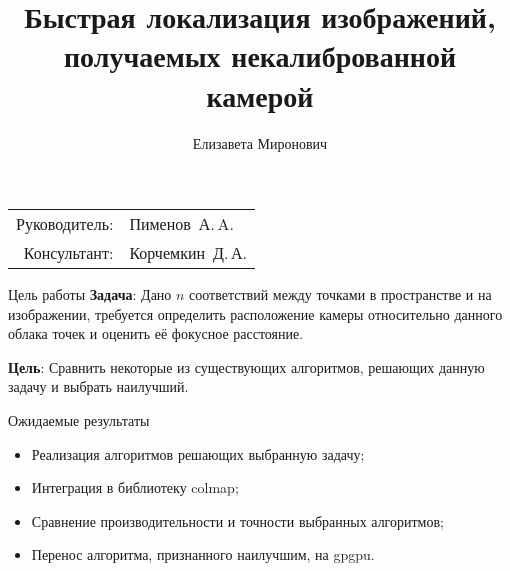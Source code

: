 \documentclass[notheorems,aspectratio=169]{beamer}
\title{Быстрая локализация изображений, получаемых некалиброванной камерой}
\author{Елизавета Миронович}
\institute[434 группа]{434 группа}
\begin{document}
\begin{frame}
  \maketitle
  	\centering
  \begin{tabular}[t]{rl}
	  Руководитель: & Пименов~А.\,A.\\
	  Консультант: & Корчемкин~Д.\,А.\\
  \end{tabular}

\end{frame}


\begin{frame}{Цель работы}
	\textbf{Задача}: Дано $n$ соответствий между точками в пространстве и на изображении, требуется определить расположение камеры относительно данного облака точек и оценить её фокусное расстояние.
	
	\bigskip
	
	\textbf{Цель}: Сравнить некоторые из существующих алгоритмов, решающих данную задачу и выбрать наилучший.

\end{frame}

\begin{frame}{Ожидаемые результаты}
    \begin{itemize}
        \item Реализация алгоритмов решающих выбранную задачу;
        \item Интеграция в библиотеку colmap;
        \item Сравнение производительности и точности выбранных алгоритмов;
        \item Перенос алгоритма, признанного наилучшим, на gpgpu.
    \end{itemize}

\end{frame}
\end{document}
